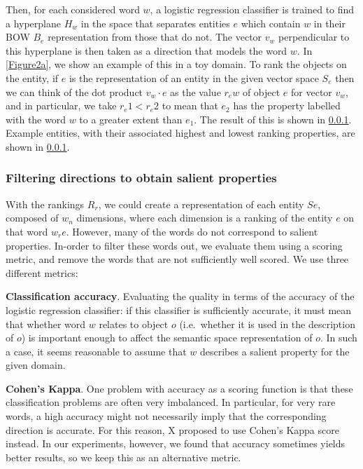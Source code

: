 \documentclass{article}
\begin{document}
Then, for each considered word $w$, a logistic regression classifier is trained to find a hyperplane $H_w$ in the space that separates entities $e$ which contain $w$ in their BOW $B_e$ representation from those that do not. %
The vector $v_w$ perpendicular to this hyperplane is then taken as a direction that models the word $w$. In \ref{Figure2a}, we show an example of this in a toy domain. %
To rank the objects on the entity, if $e$ is the representation of an entity in the given vector space $S_e$ then we can think of the dot product $v_w \cdot e$ as the value $r_ew$ of object $e$ for vector $v_w$, and in particular, we take $r_e1 < r_e2$ to mean that $e_2$ has the property labelled with the word $w$ to a greater extent than $e_1$. The result of this is shown in \ref{}. Example entities, with their associated highest and lowest ranking properties, are shown in \ref{}. %

\subsubsection{Filtering directions to obtain salient properties}
With the rankings $R_r$, we could create a representation of each entity $Se$,   composed of $w_n$ dimensions, where each dimension is a ranking of the entity $e$ on that word $w_re$. However, many of the words do not correspond to salient properties. In-order to filter these words out, we evaluate them using a scoring metric, and remove the words that are not sufficiently well scored. We use three different metrics:

\noindent \textbf{Classification accuracy}. Evaluating the quality in terms of the accuracy of the logistic regression classifier: if this classifier is sufficiently accurate, it must mean that whether word $w$ relates to object $o$ (i.e.\ whether it is used in the description of $o$) is important enough to affect the semantic space representation of $o$. In such a case, it seems reasonable to assume that $w$ describes a salient property for the given domain.%
\smallskip

\noindent \textbf{Cohen's Kappa}. One problem with accuracy as a scoring function is that these classification problems are often very imbalanced. In particular, for very rare words, a high accuracy might not necessarily imply that the corresponding direction is accurate. For this reason, X proposed to use Cohen's Kappa score instead. In our experiments, however, we found that accuracy sometimes yields better results, so we keep this as an alternative metric. %
\smallskip
\end{document}
